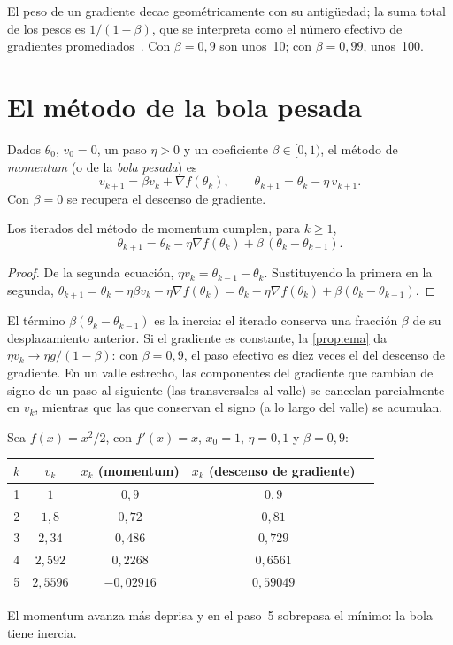 El peso de un gradiente decae geométricamente con su antigüedad; la suma total de los pesos es $1/(1-\beta)$, que se interpreta como el número efectivo de gradientes promediados~\cite[§12.6.1]{d2l}. Con $\beta=0{,}9$ son unos~10; con $\beta=0{,}99$, unos~100.

\section{El método de la bola pesada}

\begin{definicion}[Momentum]\label{def:momentum}
Dados $\theta_0$, $v_0=0$, un paso $\eta>0$ y un coeficiente $\beta\in[0,1)$, el método de \emph{momentum} (o de la \emph{bola pesada}) es
\[
v_{k+1}=\beta v_k+\nabla f(\theta_k),\qquad \theta_{k+1}=\theta_k-\eta\,v_{k+1}.
\]
Con $\beta=0$ se recupera el descenso de gradiente.
\end{definicion}

\begin{proposicion}\label{prop:dos-pasos}
Los iterados del método de momentum cumplen, para $k\ge 1$,
\[
\theta_{k+1}=\theta_k-\eta\nabla f(\theta_k)+\beta\,(\theta_k-\theta_{k-1}).
\]
\end{proposicion}

\begin{proof}
De la segunda ecuación, $\eta v_k=\theta_{k-1}-\theta_k$. Sustituyendo la primera en la segunda, $\theta_{k+1}=\theta_k-\eta\beta v_k-\eta\nabla f(\theta_k)=\theta_k-\eta\nabla f(\theta_k)+\beta(\theta_k-\theta_{k-1})$.
\end{proof}

El término $\beta(\theta_k-\theta_{k-1})$ es la inercia: el iterado conserva una fracción $\beta$ de su desplazamiento anterior. Si el gradiente es constante, la \cref{prop:ema} da $\eta v_k\to\eta g/(1-\beta)$: con $\beta=0{,}9$, el paso efectivo es diez veces el del descenso de gradiente. En un valle estrecho, las componentes del gradiente que cambian de signo de un paso al siguiente (las transversales al valle) se cancelan parcialmente en $v_k$, mientras que las que conservan el signo (a lo largo del valle) se acumulan.

\begin{ejemplo}\label{ej:momentum}
Sea $f(x)=x^{2}/2$, con $f'(x)=x$, $x_0=1$, $\eta=0{,}1$ y $\beta=0{,}9$:
\begin{center}\small
\begin{tabular}{@{}ccccc@{}}
\toprule
$k$ & $v_k$ & $x_k$ (momentum) & $x_k$ (descenso de gradiente) \\
\midrule
1 & $1$ & $0{,}9$ & $0{,}9$ \\
2 & $1{,}8$ & $0{,}72$ & $0{,}81$ \\
3 & $2{,}34$ & $0{,}486$ & $0{,}729$ \\
4 & $2{,}592$ & $0{,}2268$ & $0{,}6561$ \\
5 & $2{,}5596$ & $-0{,}02916$ & $0{,}59049$ \\
\bottomrule
\end{tabular}
\end{center}
El momentum avanza más deprisa y en el paso~5 sobrepasa el mínimo: la bola tiene inercia.
\end{ejemplo}

